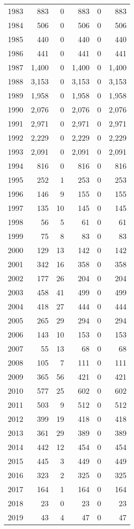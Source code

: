 \documentclass[11pt]{book}
\begin{document}
\begin{longtable}[]{@{}lrrrrr@{}}
1983 & 883 & 0 & 883 & 0 & 883\tabularnewline
1984 & 506 & 0 & 506 & 0 & 506\tabularnewline
1985 & 440 & 0 & 440 & 0 & 440\tabularnewline
1986 & 441 & 0 & 441 & 0 & 441\tabularnewline
1987 & 1,400 & 0 & 1,400 & 0 & 1,400\tabularnewline
1988 & 3,153 & 0 & 3,153 & 0 & 3,153\tabularnewline
1989 & 1,958 & 0 & 1,958 & 0 & 1,958\tabularnewline
1990 & 2,076 & 0 & 2,076 & 0 & 2,076\tabularnewline
1991 & 2,971 & 0 & 2,971 & 0 & 2,971\tabularnewline
1992 & 2,229 & 0 & 2,229 & 0 & 2,229\tabularnewline
1993 & 2,091 & 0 & 2,091 & 0 & 2,091\tabularnewline
1994 & 816 & 0 & 816 & 0 & 816\tabularnewline
1995 & 252 & 1 & 253 & 0 & 253\tabularnewline
1996 & 146 & 9 & 155 & 0 & 155\tabularnewline
1997 & 135 & 10 & 145 & 0 & 145\tabularnewline
1998 & 56 & 5 & 61 & 0 & 61\tabularnewline
1999 & 75 & 8 & 83 & 0 & 83\tabularnewline
2000 & 129 & 13 & 142 & 0 & 142\tabularnewline
2001 & 342 & 16 & 358 & 0 & 358\tabularnewline
2002 & 177 & 26 & 204 & 0 & 204\tabularnewline
2003 & 458 & 41 & 499 & 0 & 499\tabularnewline
2004 & 418 & 27 & 444 & 0 & 444\tabularnewline
2005 & 265 & 29 & 294 & 0 & 294\tabularnewline
2006 & 143 & 10 & 153 & 0 & 153\tabularnewline
2007 & 55 & 13 & 68 & 0 & 68\tabularnewline
2008 & 105 & 7 & 111 & 0 & 111\tabularnewline
2009 & 365 & 56 & 421 & 0 & 421\tabularnewline
2010 & 577 & 25 & 602 & 0 & 602\tabularnewline
2011 & 503 & 9 & 512 & 0 & 512\tabularnewline
2012 & 399 & 19 & 418 & 0 & 418\tabularnewline
2013 & 361 & 29 & 389 & 0 & 389\tabularnewline
2014 & 442 & 12 & 454 & 0 & 454\tabularnewline
2015 & 445 & 3 & 449 & 0 & 449\tabularnewline
2016 & 323 & 2 & 325 & 0 & 325\tabularnewline
2017 & 164 & 1 & 164 & 0 & 164\tabularnewline
2018 & 23 & 0 & 23 & 0 & 23\tabularnewline
2019 & 43 & 4 & 47 & 0 & 47\tabularnewline
\bottomrule
\end{longtable}
\clearpage
\end{document}
